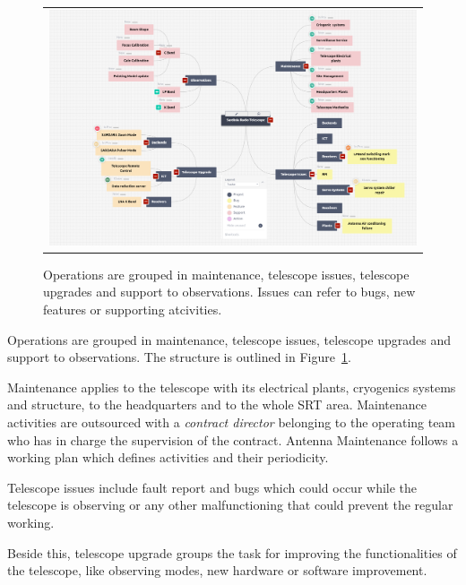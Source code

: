 \documentclass[a4paper]{spie}  %
\begin{document}
  \begin{figure} [!hb]
   \begin{center}
   \begin{tabular}{c} 
   \includegraphics[width=\textwidth]{detailed_wbs.png}
	\end{tabular}
	\end{center}
   \caption[example] 
   { \label{fig:wbs} Operations are grouped in maintenance, telescope issues, telescope upgrades and support to observations. Issues can refer to bugs, new features or supporting atcivities.}

   \end{figure} 
Operations are grouped in maintenance, telescope issues, telescope upgrades and support to observations. The structure is outlined in Figure~\ref{fig:wbs}. 

Maintenance applies to the telescope with its electrical plants, cryogenics systems and structure, to the  headquarters and to the whole SRT area. Maintenance activities are  outsourced with 
a \textit{contract director} belonging to the operating team who has in charge the supervision of the contract.   
Antenna Maintenance follows a working plan which defines activities and their periodicity. 

Telescope issues include fault report and bugs which could occur while the telescope is observing or any other malfunctioning that could prevent the regular working. 

Beside this, telescope upgrade groups the task for improving the functionalities of the telescope, like observing modes, new hardware or software improvement.
\end{document}
